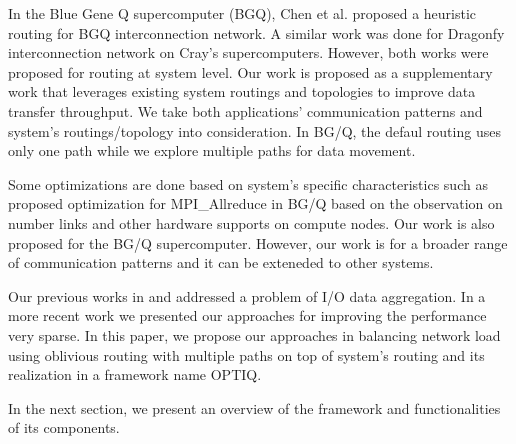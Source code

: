 In the Blue Gene Q supercomputer (BGQ), Chen et al. \cite{Chen:BGQ} proposed a heuristic routing for BGQ interconnection network. A similar \cite{garcia2013:CrayDragonfly} work was done for Dragonfy interconnection network on Cray's supercomputers. However, both works were proposed for routing at system level. Our work is proposed as a supplementary work that leverages existing system routings and topologies to improve data transfer throughput. We take both applications' communication patterns and system's routings/topology into consideration. In BG/Q, the defaul routing uses only one path while we explore multiple paths for data movement. 


Some optimizations are done based on system’s specific characteristics such as \cite{Kumar:Allreduce} proposed optimization for MPI\_Allreduce in BG/Q based on the observation on number links and other hardware supports on compute nodes. Our work is also proposed for the BG/Q supercomputer. However, our work is for a broader range of communication patterns and it can be exteneded to other systems.

Our previous works in \cite{Vishwanath:GLEAN} and \cite{SDAV:Bui2014b} addressed a problem of I/O data aggregation. In a more recent work \cite{hbui:bgq} we presented our approaches for improving the performance very sparse. In this paper, we propose our approaches in balancing network load using oblivious routing with multiple paths on top of system's routing and its realization in a framework name OPTIQ. 

In the next section, we present an overview of the framework and functionalities of its components.
